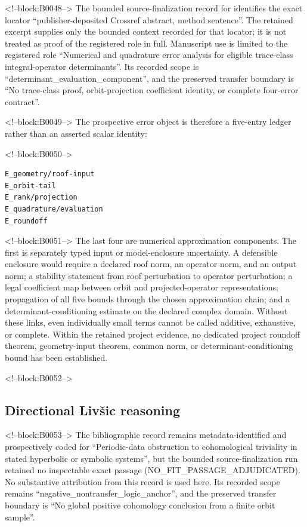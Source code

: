 \documentclass[11pt,a4paper]{article}
\begin{document}
<!--block:B0048-->
The bounded source-finalization record for \citep{P30-S22} identifies
the exact locator ``publisher-deposited Crossref abstract, method sentence''.  The retained excerpt supplies only the
bounded context recorded for that locator; it is not treated as proof of the
registered role in full.  Manuscript use is limited to the registered role ``Numerical and quadrature error analysis for eligible trace-class integral-operator determinants''.
Its recorded scope is ``determinant\_evaluation\_component'', and the preserved
transfer boundary is ``No trace-class proof, orbit-projection coefficient identity, or complete four-error contract''.

<!--block:B0049-->
The prospective error object is therefore a five-entry ledger rather than an asserted scalar identity:

<!--block:B0050-->
\begin{verbatim}
E_geometry/roof-input
E_orbit-tail
E_rank/projection
E_quadrature/evaluation
E_roundoff
\end{verbatim}

<!--block:B0051-->
The last four are numerical approximation components. The first is separately typed input or model-enclosure uncertainty. A defensible enclosure would require a declared roof norm, an operator norm, and an output norm; a stability statement from roof perturbation to operator perturbation; a legal coefficient map between orbit and projected-operator representations; propagation of all five bounds through the chosen approximation chain; and a determinant-conditioning estimate on the declared complex domain. Without these links, even individually small terms cannot be called additive, exhaustive, or complete. Within the retained project evidence, no dedicated project roundoff theorem, geometry-input theorem, common norm, or determinant-conditioning bound has been established.

<!--block:B0052-->
\subsection{Directional Livšic reasoning}

<!--block:B0053-->
The bibliographic record \citep{P30-S23} remains metadata-identified and
prospectively coded for ``Periodic-data obstruction to cohomological triviality in stated hyperbolic or symbolic systems'', but the bounded source-finalization
run retained no inspectable exact passage (NO\_FIT\_PASSAGE\_ADJUDICATED).  No substantive
attribution from this record is used here.  Its recorded scope remains
``negative\_nontransfer\_logic\_anchor'', and the preserved transfer boundary is ``No global positive cohomology conclusion from a finite orbit sample''.
\end{document}
